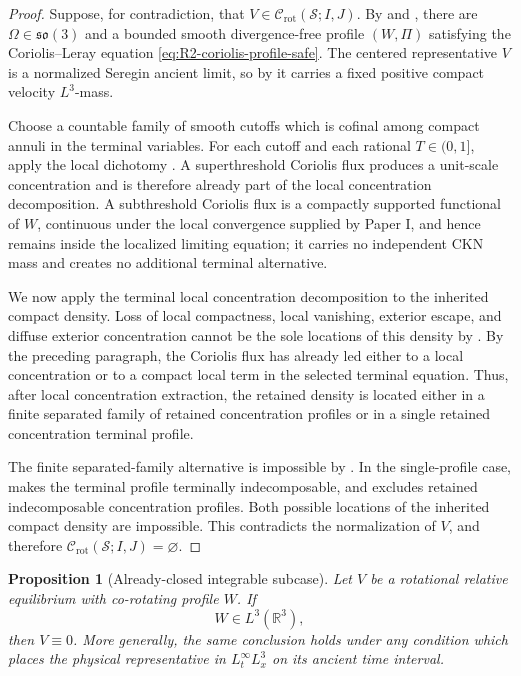 \documentclass[11pt]{amsart}
\numberwithin{equation}{section}
\theoremstyle{plain}
\newtheorem{proposition}[theorem]{Proposition}
\theoremstyle{definition}
\theoremstyle{remark}
\newcommand{\Crot}{\mathcal C_{\mathrm{rot}}}
\begin{document}
\begin{proof}
Suppose, for contradiction, that
\(V\in\Crot(\mathcal S;I,J)\).  By
 and
, there are
\(\Omega\in\mathfrak{so}(3)\) and a bounded smooth divergence-free profile
\((W,\Pi)\) satisfying the Coriolis--Leray equation
\eqref{eq:R2-coriolis-profile-safe}.  The centered representative \(V\) is a
normalized Seregin ancient limit, so by
 it carries a fixed positive compact
velocity \(L^3\)-mass.

Choose a countable family of smooth cutoffs which is cofinal among compact
annuli in the terminal variables.  For each cutoff and each rational
\(T\in(0,1]\), apply the local dichotomy
.  A superthreshold Coriolis flux produces
a unit-scale concentration and is therefore already part of the local
concentration decomposition.  A subthreshold Coriolis flux is a compactly
supported functional
of \(W\), continuous under the local convergence supplied by Paper I, and hence
remains inside the localized limiting equation; it carries no independent CKN
mass and creates no additional terminal alternative.

We now apply the terminal local concentration decomposition to the inherited compact
density.  Loss of local compactness, local vanishing, exterior escape, and
diffuse exterior concentration cannot be the sole locations of this density by
.  By the preceding paragraph, the
Coriolis flux has already led either to a local concentration or to a
compact local term in the selected terminal equation.  Thus, after local
concentration extraction, the retained density is located either in a finite separated family
of retained concentration profiles or in a single retained concentration
terminal profile.

The finite separated-family alternative is impossible by
.  In the single-profile case,
 makes the terminal profile terminally
indecomposable, and  excludes retained
indecomposable concentration profiles.  Both possible locations of the inherited
compact density are impossible.  This
contradicts the normalization of \(V\), and therefore
\(\Crot(\mathcal S;I,J)=\varnothing\).
\end{proof}

\begin{proposition}[Already-closed integrable subcase]
\label{prop:R2-integrable-subcase}
Let \(V\) be a rotational relative equilibrium with co-rotating profile \(W\).
If
\begin{equation}\label{eq:R2-L3-subcase}
   W\in L^3(\mathbb R^3),
\end{equation}
then \(V\equiv0\).  More generally, the same conclusion holds under any
condition which places the physical representative in
\(L^\infty_tL^3_x\) on its ancient time interval.
\end{proposition}
\end{document}
